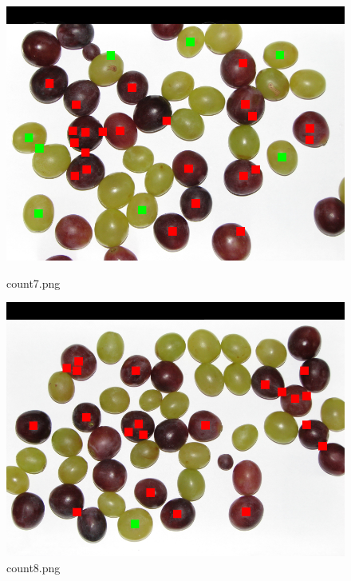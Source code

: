 \documentclass{classrep}
\begin{document}
\begin{figure}
  \begin{minipage}{0.3\linewidth}
    \centering
    \includegraphics[width=\textwidth]{gfx/count7_overlayed.png}
    \caption{count7.png}
    \label{fig:c7}
  \end{minipage}
  \hspace{0.5cm}
  \begin{minipage}{0.3\linewidth}
    \centering
    \includegraphics[width=\textwidth]{gfx/count8_overlayed.png}
    \caption{count8.png}
    \label{fig:c8}
  \end{minipage}
  \begin{minipage}{0.3\linewidth}
    \centering

\end{minipage}
\end{figure}
\end{document}
